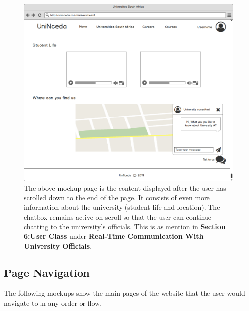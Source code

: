 \documentclass[a4paper, 12pt]{article}
\begin{document}
\begin{figure}[H]
\centering
\includegraphics[scale=0.5]{UniversitiesPage2}
\caption{\small \small{The above mockup page is the content displayed after the user has scrolled down to the end of the page. It consists of even more information about the university (student life and location). The chatbox remains active on scroll so that the user can continue chatting to the university's officials. This is as mention in \textbf{Section 6:User Class} under \textbf{Real-Time Communication With University Officials}.}}
\label{UniversitiesPage2}
\end{figure}

\newpage

\subsection{Page Navigation}
\renewcommand{\figurename}{Figure}
\setcounter{figure}{0}
The following mockups show the main pages of the website that the user would navigate to in any order or flow.
\end{document}
